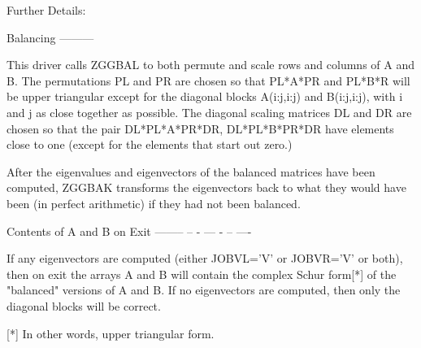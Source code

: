 \begin{DoxyParagraph}{Further Details\+: }
\begin{DoxyVerb}  Balancing
  ---------

  This driver calls ZGGBAL to both permute and scale rows and columns
  of A and B.  The permutations PL and PR are chosen so that PL*A*PR
  and PL*B*R will be upper triangular except for the diagonal blocks
  A(i:j,i:j) and B(i:j,i:j), with i and j as close together as
  possible.  The diagonal scaling matrices DL and DR are chosen so
  that the pair  DL*PL*A*PR*DR, DL*PL*B*PR*DR have elements close to
  one (except for the elements that start out zero.)

  After the eigenvalues and eigenvectors of the balanced matrices
  have been computed, ZGGBAK transforms the eigenvectors back to what
  they would have been (in perfect arithmetic) if they had not been
  balanced.

  Contents of A and B on Exit
  -------- -- - --- - -- ----

  If any eigenvectors are computed (either JOBVL='V' or JOBVR='V' or
  both), then on exit the arrays A and B will contain the complex Schur
  form[*] of the "balanced" versions of A and B.  If no eigenvectors
  are computed, then only the diagonal blocks will be correct.

  [*] In other words, upper triangular form.\end{DoxyVerb}
 
\end{DoxyParagraph}
\hypertarget{group__complex16GEeigen_ga788ffb82ac609cc3e99de43c4cea3e7b}{}
